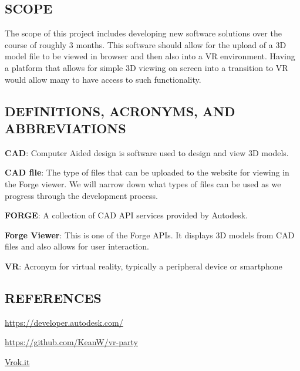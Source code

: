 \documentclass[letterpaper, 10pt, draftclsnofoot, compsoc, onecolumn]{IEEEtran}
\begin{document}
\subsection[SCOPE]{\rmfamily\bfseries\color{black}
SCOPE}
	The scope of this project includes developing new software solutions over the course of roughly 3 months. This software
 	should allow for the upload of a 3D model file to be viewed in browser and then also into a VR environment. Having a 
	platform that allows for simple 3D viewing on screen into a transition to VR would allow many to have access to such 
	functionality. 

\subsection[DEFINITIONS, ACRONYMS, AND
ABBREVIATIONS]{\rmfamily\bfseries\color{black}
DEFINITIONS, ACRONYMS, AND ABBREVIATIONS}
	\begin{flushleft}
	\textbf{CAD}: Computer Aided design is software used to design and view 3D models.

	\textbf{CAD file}: The type of files that can be uploaded to the website for viewing in the Forge viewer.
	We will  narrow down what types of files can be used as we progress through the development process.

	\textbf{FORGE}: A collection of CAD API services provided by Autodesk.

	\textbf{Forge Viewer}: This is one of the Forge APIs. It displays 3D models from CAD files and also allows
	for user interaction.

	\textbf{VR}: Acronym for virtual reality, typically a peripheral device or smartphone
	\end{flushleft} 
	
\subsection[REFERENCES]{\rmfamily\bfseries\color{black}
REFERENCES}
	\begin{flushleft}
	\url{https://developer.autodesk.com/}\newline

	\url{https://github.com/KeanW/vr-party}\newline

	\url{Vrok.it}\newline
	\end{flushleft}
\end{document}
